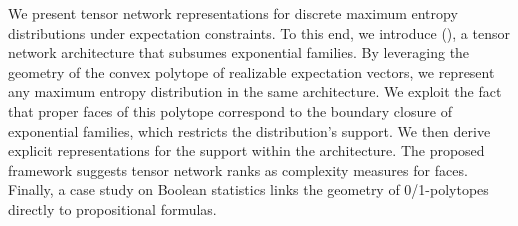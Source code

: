 We present tensor network representations for discrete maximum entropy distributions under expectation constraints.
To this end, we introduce \ComputationActivationNetworks{} (\CompActNets{}), a tensor network architecture that subsumes exponential families.
By leveraging the geometry of the convex polytope of realizable expectation vectors, we represent any maximum entropy distribution in the same architecture.
We exploit the fact that proper faces of this polytope correspond to the boundary closure of exponential families, which restricts the distribution's support.
We then derive explicit representations for the support within the \CompActNet{} architecture.
The proposed framework suggests tensor network ranks as complexity measures for faces.
Finally, a case study on Boolean statistics links the geometry of 0/1-polytopes directly to propositional formulas.


